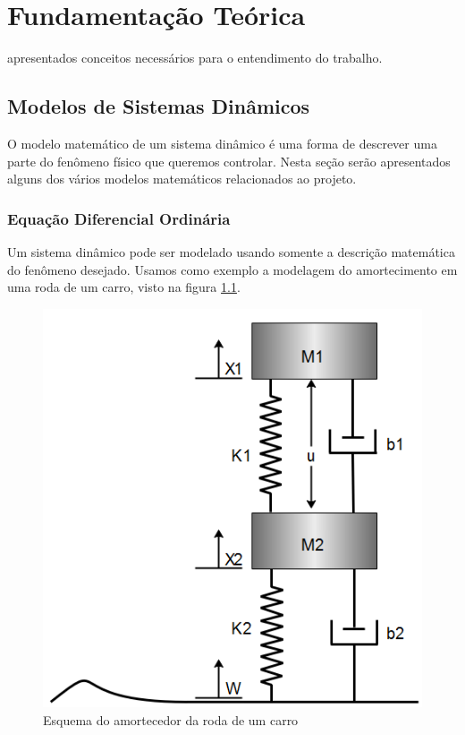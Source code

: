 \chapter{ Fundamentação Teórica} \label{cap2}


 apresentados conceitos necessários para o entendimento do trabalho. 


\section{Modelos de Sistemas Dinâmicos}\label{capA}
O modelo matemático de um sistema dinâmico é uma forma de descrever uma parte do fenômeno físico que queremos controlar. Nesta seção serão apresentados alguns dos vários modelos matemáticos relacionados ao projeto.
\subsection{Equação Diferencial Ordinária}
Um sistema dinâmico pode ser modelado usando somente a descrição matemática do fenômeno desejado. Usamos como exemplo a modelagem do amortecimento em uma roda de um carro, visto na figura \ref{fig:modeloamortecimento}.

\begin{figure}
	\centering
	\includegraphics[width=0.5\linewidth]{modelo_amortecimento}
	\caption{Esquema do amortecedor da roda de um carro}
	\label{fig:modeloamortecimento}
\end{figure}

